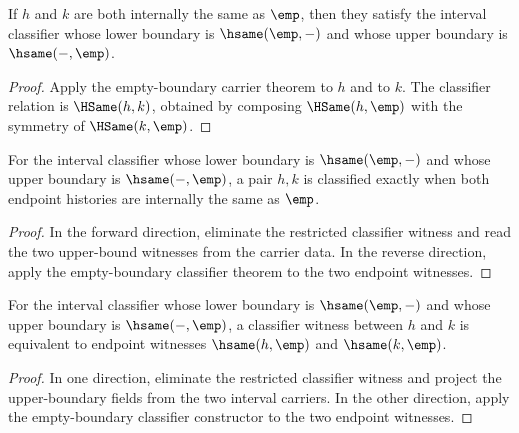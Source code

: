 \begin{theorem}
\label{thm:interval-empty-boundary-classifier}
If \(h\) and \(k\) are both internally the same as \(\emp\), then they satisfy the interval classifier whose lower boundary is \(\hsame(\emp,-)\) and whose upper boundary is \(\hsame(-,\emp)\).
\end{theorem}
\begin{proof}
Apply the empty-boundary carrier theorem to \(h\) and to \(k\). The classifier relation is \(\HSame(h,k)\), obtained by composing \(\HSame(h,\emp)\) with the symmetry of \(\HSame(k,\emp)\).
\end{proof}

\begin{theorem}
\label{thm:interval-empty-boundary-classifier-characterization}
For the interval classifier whose lower boundary is \(\hsame(\emp,-)\) and
whose upper boundary is \(\hsame(-,\emp)\), a pair \(h,k\) is classified
exactly when both endpoint histories are internally the same as \(\emp\).
\end{theorem}
\begin{proof}
In the forward direction, eliminate the restricted classifier witness and read
the two upper-bound witnesses from the carrier data. In the reverse direction,
apply the empty-boundary classifier theorem to the two endpoint witnesses.
\end{proof}

\begin{theorem}
\label{thm:interval-empty-boundary-classifier-iff-endpoints}
For the interval classifier whose lower boundary is $\hsame(\emp,-)$ and whose upper boundary is $\hsame(-,\emp)$, a classifier witness between $h$ and $k$ is equivalent to endpoint witnesses $\hsame(h,\emp)$ and $\hsame(k,\emp)$.
\end{theorem}
\begin{proof}
In one direction, eliminate the restricted classifier witness and project the upper-boundary fields from the two interval carriers. In the other direction, apply the empty-boundary classifier constructor to the two endpoint witnesses.
\end{proof}

